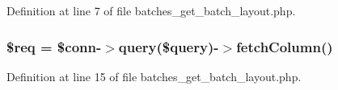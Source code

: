 Definition at line 7 of file batches\-\_\-get\-\_\-batch\-\_\-layout.\-php.

\hypertarget{batches__get__batch__layout_8php_a63a7a283ea5dee8af1e2d5a3435bf370}{
\subsubsection[{\$req}]{\setlength{\rightskip}{0pt plus 5cm}\$req = \$conn-\/$>$query(\$query)-\/$>$fetch\-Column()}}\label{batches__get__batch__layout_8php_a63a7a283ea5dee8af1e2d5a3435bf370}


Definition at line 15 of file batches\-\_\-get\-\_\-batch\-\_\-layout.\-php.

